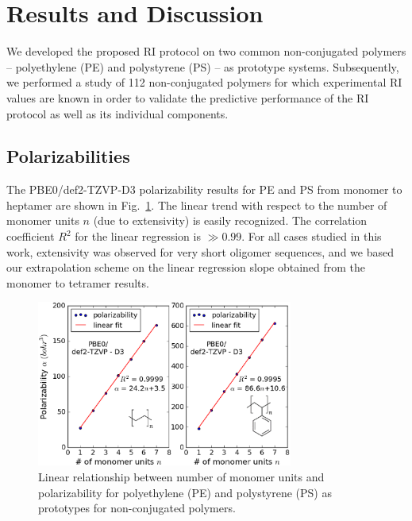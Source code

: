 \section{Results and Discussion}
\label{sec:results_discussion}
We developed the proposed RI protocol on two common non-conjugated polymers -- polyethylene (PE) and polystyrene (PS) -- as prototype systems. Subsequently, we performed a study of 112 non-conjugated polymers for which experimental RI values are known in order to validate the predictive performance of the RI protocol as well as its individual components. 

\subsection{Polarizabilities}
\label{subsec:polarizability_results}
The PBE0/def2-TZVP-D3 polarizability results for PE and PS from monomer to heptamer are shown in Fig.\ \ref{fig:pol_lin}. The linear trend with respect to the number of monomer units $n$ (due to extensivity) is easily recognized. The correlation coefficient $R^2$ for the linear regression is $\gg0.99$. For all cases studied in this work, extensivity was observed for very short oligomer sequences, and we based our extrapolation scheme on the linear regression slope obtained from the monomer to tetramer results.


\begin{figure}[htbp] 
	\centering
	\includegraphics[width=0.75\textwidth]{Chapter-2/Figures/plot_pol.eps}
	\caption{Linear relationship between number of monomer units and polarizability for polyethylene (PE) and polystyrene (PS) as prototypes for non-conjugated polymers.} 
	\label{fig:pol_lin} 
\end{figure}  

